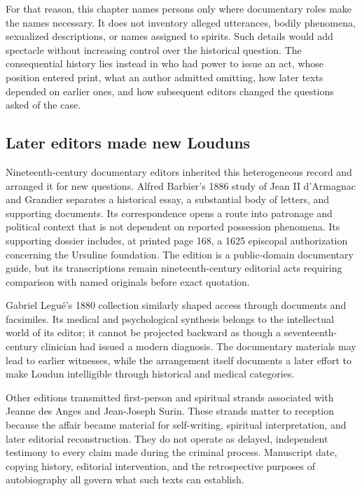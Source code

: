 For that reason, this chapter names persons only where documentary roles make
the names necessary.  It does not inventory alleged utterances, bodily
phenomena, sexualized descriptions, or names assigned to spirits.  Such
details would add spectacle without increasing control over the historical
question.  The consequential history lies instead in who had power to issue an
act, whose position entered print, what an author admitted omitting, how later
texts depended on earlier ones, and how subsequent editors changed the
questions asked of the case.

\subsection{Later editors made new Louduns}

Nineteenth-century documentary editors inherited this heterogeneous record
and arranged it for new questions.  Alfred Barbier's 1886 study of Jean II
d'Armagnac and Grandier separates a historical essay, a substantial body of
letters, and supporting documents.  Its correspondence opens a route into
patronage and political context that is not dependent on reported possession
phenomena.  Its supporting dossier includes, at printed page 168, a 1625
episcopal authorization concerning the Ursuline foundation.  The edition is a
public-domain documentary guide, but its transcriptions remain
nineteenth-century editorial acts requiring comparison with named originals
before exact quotation.

Gabriel Legué's 1880 collection similarly shaped access through documents and
facsimiles.  Its medical and psychological synthesis belongs to the
intellectual world of its editor; it cannot be projected backward as though a
seventeenth-century clinician had issued a modern diagnosis.  The documentary
materials may lead to earlier witnesses, while the arrangement itself
documents a later effort to make Loudun intelligible through historical and
medical categories.

Other editions transmitted first-person and spiritual strands associated with
Jeanne des Anges and Jean-Joseph Surin.  These strands matter to reception
because the affair became material for self-writing, spiritual interpretation,
and later editorial reconstruction.  They do not operate as delayed,
independent testimony to every claim made during the criminal process.
Manuscript date, copying history, editorial intervention, and the retrospective
purposes of autobiography all govern what such texts can establish.

